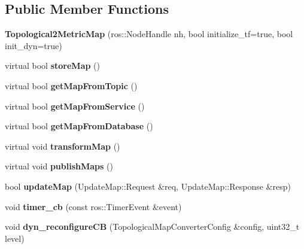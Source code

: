 \subsection*{Public Member Functions}
\begin{DoxyCompactItemize}
\item 
\mbox{\label{classgr__map__utils_1_1Topological2MetricMap_a6d6bf2ea20fb5d385c3bf653abcd62e6}} 
{\bfseries Topological2\+Metric\+Map} (ros\+::\+Node\+Handle nh, bool initialize\+\_\+tf=true, bool init\+\_\+dyn=true)
\item 
\mbox{\label{classgr__map__utils_1_1Topological2MetricMap_accca280444336c009d8edee8881a6c9d}} 
virtual bool {\bfseries store\+Map} ()
\item 
\mbox{\label{classgr__map__utils_1_1Topological2MetricMap_a0cc94b07abb8f649c93035156615edae}} 
virtual bool {\bfseries get\+Map\+From\+Topic} ()
\item 
\mbox{\label{classgr__map__utils_1_1Topological2MetricMap_aa87f17d63a092a0c6b819e25fdbb4923}} 
virtual bool {\bfseries get\+Map\+From\+Service} ()
\item 
\mbox{\label{classgr__map__utils_1_1Topological2MetricMap_a4ec9577561920cfcca32878f233cbf91}} 
virtual bool {\bfseries get\+Map\+From\+Database} ()
\item 
\mbox{\label{classgr__map__utils_1_1Topological2MetricMap_ab0ae2ad72302af1e5e038dc492c2a47a}} 
virtual void {\bfseries transform\+Map} ()
\item 
\mbox{\label{classgr__map__utils_1_1Topological2MetricMap_a9de68d38f7b4600fc2aecda021888a1b}} 
virtual void {\bfseries publish\+Maps} ()
\item 
\mbox{\label{classgr__map__utils_1_1Topological2MetricMap_aae3af8577fb284c46977d1a261613753}} 
bool {\bfseries update\+Map} (Update\+Map\+::\+Request \&req, Update\+Map\+::\+Response \&resp)
\item 
\mbox{\label{classgr__map__utils_1_1Topological2MetricMap_abc85730ec953ab15735062d8a211bbc2}} 
void {\bfseries timer\+\_\+cb} (const ros\+::\+Timer\+Event \&event)
\item 
\mbox{\label{classgr__map__utils_1_1Topological2MetricMap_a69c5591684631c33e7fe3e1df58c6d03}} 
void {\bfseries dyn\+\_\+reconfigure\+CB} (Topological\+Map\+Converter\+Config \&config, uint32\+\_\+t level)
\end{DoxyCompactItemize}
